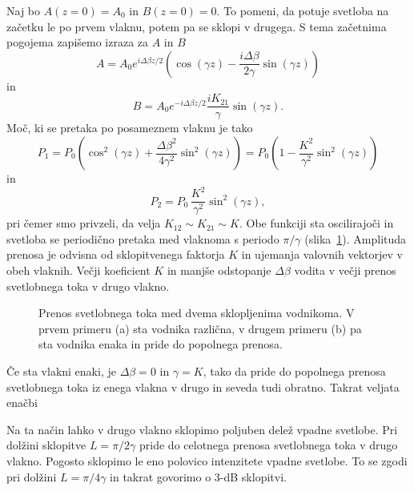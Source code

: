 Naj bo $A(z=0) = A_0$ in $B(z=0)=0$. To pomeni, da potuje svetloba na začetku
le po prvem vlaknu, potem pa se sklopi v drugega. S tema začetnima pogojema zapišemo izraza 
za $A$ in $B$
\begin{equation}
 A = A_0 e^{i \Delta \beta z/2} \left( \cos(\gamma z) - 
\frac{i \Delta \beta}{2 \gamma}\sin(\gamma z) \right)
\end{equation}
in
\begin{equation}
B =  A_0 e^{-i \Delta \beta z/2} \frac{i K_{21}}{\gamma}\sin(\gamma z).
\end{equation}
Moč, ki se pretaka po posameznem vlaknu je tako
\begin{equation}
P_1 = P_0 \left( \cos^2(\gamma z) + \frac{\Delta \beta^2}{4 \gamma^2}\sin^2(\gamma z) \right)
= P_0 \left( 1 - \frac{K^2}{\gamma^2}\sin^2(\gamma z) \right)
\end{equation}
in
\begin{equation}
P_2 =  P_0\, \frac{K^2}{\gamma^2}\sin^2(\gamma z),
\end{equation}
pri čemer smo privzeli, da velja $K_{12} \sim K_{21} \sim K$. 
Obe funkciji sta oscilirajoči in svetloba se periodično pretaka med vlaknoma
s periodo $\pi/\gamma$ (slika~\ref{fig:foscil}). Amplituda prenosa je 
odvisna od sklopitvenega faktorja $K$ in ujemanja valovnih 
vektorjev v obeh vlaknih. Večji koeficient $K$
in manjše odstopanje $\Delta \beta$ vodita v večji prenos svetlobnega toka v drugo vlakno. 
\begin{figure}[h!]
\centering
\def\svgwidth{140truemm} 
 
\caption{Prenos svetlobnega toka med dvema sklopljenima vodnikoma. V prvem primeru (a) sta
vodnika različna, v drugem primeru (b) pa sta vodnika enaka in pride do popolnega prenosa.}
\label{fig:foscil}
\end{figure}

Če sta vlakni 
enaki, je $\Delta \beta = 0$ in $\gamma = K$, tako da pride do popolnega prenosa
svetlobnega toka iz enega vlakna v drugo in seveda tudi obratno.
Takrat veljata enačbi

Na ta način lahko v drugo vlakno sklopimo poljuben delež vpadne svetlobe. 
Pri dolžini sklopitve $L = \pi/2 \gamma$ pride do celotnega prenosa svetlobnega toka v drugo vlakno.
Pogosto sklopimo le eno polovico intenzitete vpadne svetlobe. To se zgodi pri dolžini 
$L = \pi/4 \gamma$ in takrat govorimo o 3-dB sklopitvi. 

